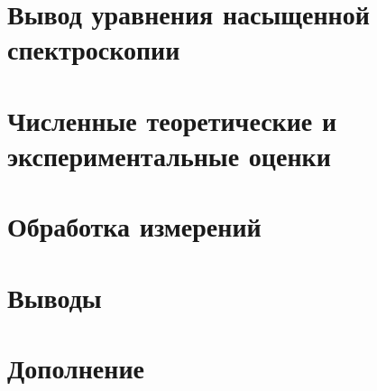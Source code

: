 





\newpage


\section{Вывод уравнения насыщенной спектроскопии}





\newpage
\section{Численные теоретические и экспериментальные оценки}



\newpage
\section{Обработка измерений}



\section{Выводы}



\newpage
\section{Дополнение}





